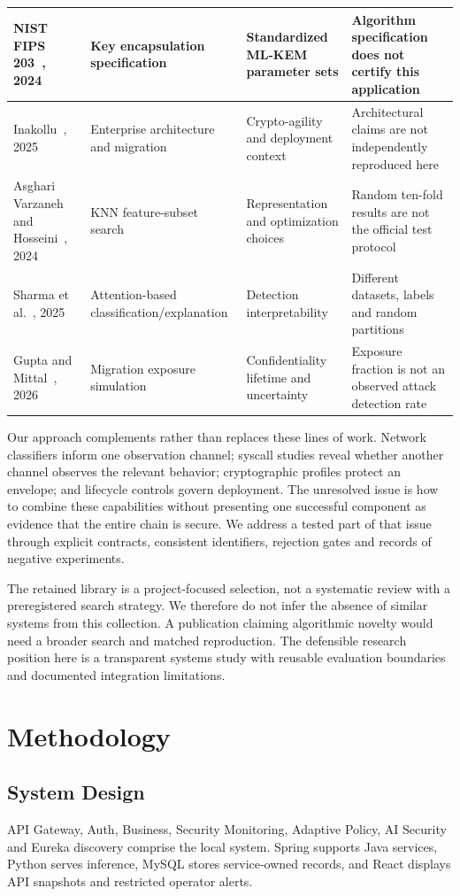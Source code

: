 \documentclass[conference,a4paper]{IEEEtran}
\begin{document}
\begin{table}[t]
\begin{tabularx}{\textwidth}{|p{}|p{}|Y|Y|}
NIST FIPS 203~\cite{kem}, 2024 & Key encapsulation specification & Standardized ML-KEM parameter sets & Algorithm specification does not certify this application\\\hline
Inakollu~\cite{enterprise}, 2025 & Enterprise architecture and migration & Crypto-agility and deployment context & Architectural claims are not independently reproduced here\\\hline
Asghari Varzaneh and Hosseini~\cite{feature}, 2024 & KNN feature-subset search & Representation and optimization choices & Random ten-fold results are not the official test protocol\\\hline
Sharma et al.~\cite{xai}, 2025 & Attention-based classification/explanation & Detection interpretability & Different datasets, labels and random partitions\\\hline
Gupta and Mittal~\cite{readiness}, 2026 & Migration exposure simulation & Confidentiality lifetime and uncertainty & Exposure fraction is not an observed attack detection rate\\\hline
\end{tabularx}
\end{table}

Our approach complements rather than replaces these lines of work. Network classifiers inform one observation channel; syscall studies reveal whether another channel observes the relevant behavior; cryptographic profiles protect an envelope; and lifecycle controls govern deployment. The unresolved issue is how to combine these capabilities without presenting one successful component as evidence that the entire chain is secure. We address a tested part of that issue through explicit contracts, consistent identifiers, rejection gates and records of negative experiments.

The retained library is a project-focused selection, not a systematic review with a preregistered search strategy. We therefore do not infer the absence of similar systems from this collection. A publication claiming algorithmic novelty would need a broader search and matched reproduction. The defensible research position here is a transparent systems study with reusable evaluation boundaries and documented integration limitations.

\section{Methodology}
\subsection{System Design}
API Gateway, Auth, Business, Security Monitoring, Adaptive Policy, AI Security and Eureka discovery comprise the local system. Spring supports Java services, Python serves inference, MySQL stores service-owned records, and React displays API snapshots and restricted operator alerts.
\end{document}
